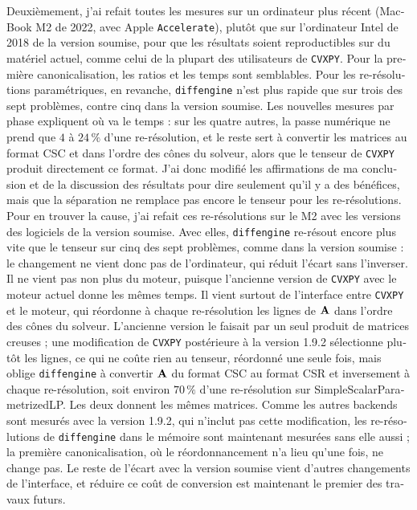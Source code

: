 \documentclass[letterpaper,12pt]{article}
\begin{document}
\begin{otherlanguage}{french}
Deuxièmement, j'ai refait toutes les mesures sur un ordinateur plus récent (MacBook M2 de 2022,
avec Apple \texttt{Accelerate}), plutôt que sur l'ordinateur Intel de 2018 de la version
soumise, pour que les résultats soient reproductibles sur du matériel actuel, comme celui de la
plupart des utilisateurs de \texttt{CVXPY}. Pour la première canonicalisation, les ratios et les
temps sont semblables. Pour les re-résolutions paramétriques, en revanche, \texttt{diffengine}
n'est plus rapide que sur trois des sept problèmes, contre cinq dans la version soumise. Les
nouvelles mesures par phase expliquent où va le temps : sur les quatre autres, la passe
numérique ne prend que $4$ à $24\,\%$ d'une re-résolution,
et le reste sert à convertir les matrices au format CSC et dans l'ordre des cônes du solveur,
alors que le tenseur de \texttt{CVXPY} produit directement ce format. J'ai donc modifié les
affirmations de ma conclusion et de la discussion des résultats pour dire seulement qu'il y a
des bénéfices, mais que la séparation ne remplace pas encore le tenseur pour les re-résolutions.
Pour en trouver la cause, j'ai refait ces re-résolutions sur le M2 avec les versions des
logiciels de la version soumise. Avec elles, \texttt{diffengine} re-résout encore plus vite
que le tenseur sur cinq des sept problèmes, comme dans la version soumise : le changement ne
vient donc pas de l'ordinateur, qui réduit l'écart sans l'inverser. Il ne vient pas non plus du
moteur, puisque l'ancienne version de \texttt{CVXPY} avec le moteur actuel donne les mêmes
temps. Il vient surtout de l'interface entre \texttt{CVXPY} et le moteur, qui réordonne à
chaque re-résolution les lignes de $\mathbf{A}$ dans l'ordre des cônes du solveur. L'ancienne
version le faisait par un seul produit de matrices creuses ; une modification de
\texttt{CVXPY} postérieure à la version 1.9.2 sélectionne plutôt les lignes, ce qui ne coûte
rien au tenseur, réordonné une seule fois, mais oblige \texttt{diffengine} à convertir
$\mathbf{A}$ du format CSC au format CSR et inversement à chaque re-résolution, soit environ
$70\,\%$ d'une re-résolution sur SimpleScalarParametrizedLP. Les deux donnent les mêmes
matrices. Comme les autres backends sont mesurés avec la version 1.9.2, qui n'inclut pas cette
modification, les re-résolutions de \texttt{diffengine} dans le mémoire sont maintenant
mesurées sans elle aussi ; la première canonicalisation, où le réordonnancement n'a lieu
qu'une fois, ne change pas. Le reste de l'écart avec la version soumise vient d'autres
changements de l'interface, et réduire ce coût de conversion est maintenant le premier des
travaux futurs.


\end{otherlanguage}
\end{document}
